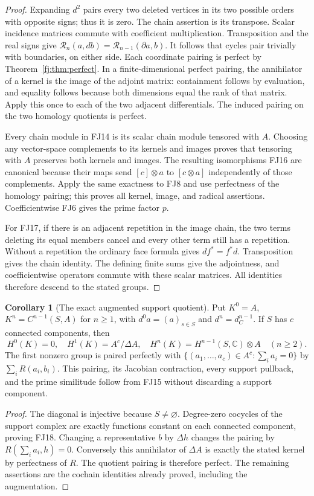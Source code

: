 \documentclass[11pt,a4paper]{article}
\theoremstyle{definition}\newtheorem{definition}[theorem]{Definition}
\newcommand{\C}{\mathbb C}\newcommand{\R}{\mathbb R}
\newtheorem{corollary}[theorem]{Corollary}
\begin{document}
\begin{proof}
Expanding $d^2$ pairs every two deleted vertices in its two possible
orders with opposite signs; thus it is zero. The chain assertion is
its transpose. Scalar incidence matrices commute with coefficient
multiplication. Transposition and the real signs give
$\mathcal R_n(a,db)=\mathcal R_{n-1}(\partial a,b)$.
It follows that cycles pair trivially with boundaries, on either side.
Each coordinate pairing is perfect by Theorem~\ref{fj:thm:perfect}.
In a finite-dimensional perfect pairing, the annihilator of a kernel
is the image of the adjoint matrix: containment follows by evaluation,
and equality follows because both dimensions equal the rank of that
matrix. Apply this once to each of the two adjacent differentials.
The induced pairing on the two homology quotients is perfect.

Every chain module in FJ14 is its scalar chain module tensored with
$A$. Choosing any vector-space complements to its kernels and images
proves that tensoring with $A$ preserves both kernels and images.
The resulting isomorphisms FJ16 are canonical because their maps send
$[c]\otimes a$ to $[c\otimes a]$ independently of those complements.
Apply the same exactness to FJ8 and use perfectness of the homology
pairing; this proves all kernel, image, and radical assertions.
Coefficientwise FJ6 gives the prime factor $p$.

For FJ17, if there is an adjacent repetition in the image chain,
the two terms deleting its equal members cancel and every other term
still has a repetition. Without a repetition the ordinary face
formula gives $df^*=f^*d$. Transposition gives the chain identity.
The defining finite sums give the adjointness, and coefficientwise
operators commute with these scalar matrices. All identities therefore
descend to the stated groups.
\end{proof}

\begin{corollary}[The exact augmented support quotient]
\label{fj:cor:augmented}
Put $K^0=A$, $K^n=C^{n-1}(S,A)$ for $n\ge1$, with
$d^0a=(a)_{s\in S}$ and $d^n=d_C^{n-1}$. If $S$ has $c$ connected
components, then
\[
 H^0(K)=0,\quad H^1(K)=A^c/\Delta A,
 \quad H^n(K)=H^{n-1}(S,\C)\otimes A\quad(n\ge2).
 \tag{FJ18}\label{fj:fj:augmented}
\]
The first nonzero group is paired perfectly with
$\{(a_1,\ldots,a_c)\in A^c:\sum_i a_i=0\}$ by
$\sum_iR(a_i,b_i)$. This pairing, its Jacobian contraction, every
support pullback, and the prime similitude follow from FJ15 without
discarding a support component.
\end{corollary}
\begin{proof}
The diagonal is injective because $S\ne\varnothing$.
Degree-zero cocycles of the support complex are exactly functions
constant on each connected component, proving FJ18. Changing a
representative $b$ by $\Delta h$ changes the pairing by
$R(\sum_i a_i,h)=0$. Conversely this annihilator of $\Delta A$
is exactly the stated kernel by perfectness of $R$. The quotient
pairing is therefore perfect. The remaining assertions are the
cochain identities already proved, including the augmentation.
\end{proof}
\end{document}
